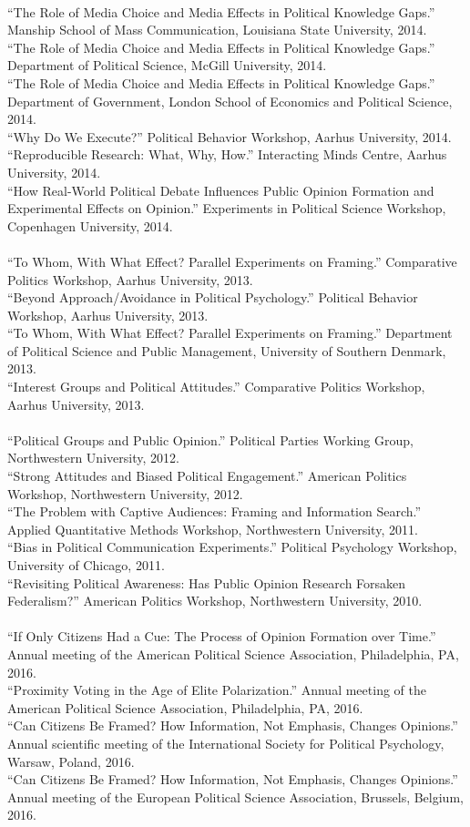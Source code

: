 \documentclass[12pt]{article}
\newcommand{\topic}[1]{\pagebreak[3]\indent {\color{lg}{\footnotesize #1 }}\\}
\newcommand{\entry}[1]{\indent {\color{lg}\guillemotright}\hspace{2pt}#1\vspace{.25em}\\}
\begin{document}
	\topic{Invited Presentations (2014)}
	\entry{``The Role of Media Choice and Media Effects in Political Knowledge Gaps.'' Manship School of Mass Communication, Louisiana State University, 2014.}
	\entry{``The Role of Media Choice and Media Effects in Political Knowledge Gaps.'' Department of Political Science, McGill University, 2014.}
	\entry{``The Role of Media Choice and Media Effects in Political Knowledge Gaps.'' Department of Government, London School of Economics and Political Science, 2014.}
	\entry{``Why Do We Execute?'' Political Behavior Workshop, Aarhus University, 2014.}
	\entry{``Reproducible Research: What, Why, How.'' Interacting Minds Centre, Aarhus University, 2014.}
	\entry{``How Real-World Political Debate Influences Public Opinion Formation and Experimental Effects on Opinion.'' Experiments in Political Science Workshop, Copenhagen University, 2014.}

	\topic{Invited Presentations (2013)}
	\entry{``To Whom, With What Effect? Parallel Experiments on Framing.'' Comparative Politics Workshop, Aarhus University, 2013.}
	\entry{``Beyond Approach/Avoidance in Political Psychology.'' Political Behavior Workshop, Aarhus University, 2013.}
	\entry{``To Whom, With What Effect? Parallel Experiments on Framing.'' Department of Political Science and Public Management, University of Southern Denmark, 2013.}
	\entry{``Interest Groups and Political Attitudes.'' Comparative Politics Workshop, Aarhus University, 2013.}
	
	\topic{Invited Presentations (2012 and earlier)}
	\entry{``Political Groups and Public Opinion.'' Political Parties Working Group, Northwestern University, 2012.}
	\entry{``Strong Attitudes and Biased Political Engagement.'' American Politics Workshop, Northwestern University, 2012.}
	\entry{``The Problem with Captive Audiences: Framing and Information Search.'' Applied Quantitative Methods Workshop, Northwestern University, 2011.}
	\entry{``Bias in Political Communication Experiments.'' Political Psychology Workshop, University of Chicago, 2011.}
	\entry{``Revisiting Political Awareness: Has Public Opinion Research Forsaken Federalism?'' American Politics Workshop, Northwestern University, 2010.}

	\topic{Conference Papers (2016)}
	\entry{``If Only Citizens Had a Cue: The Process of Opinion Formation over Time.'' Annual meeting of the American Political Science Association, Philadelphia, PA, 2016.}
	\entry{``Proximity Voting in the Age of Elite Polarization.'' Annual meeting of the American Political Science Association, Philadelphia, PA, 2016.}
	\entry{``Can Citizens Be Framed? How Information, Not Emphasis, Changes Opinions.'' Annual scientific meeting of the International Society for Political Psychology, Warsaw, Poland, 2016.}
	\entry{``Can Citizens Be Framed? How Information, Not Emphasis, Changes Opinions.'' Annual meeting of the European Political Science Association, Brussels, Belgium, 2016.}
	
\end{document}
